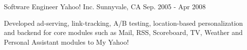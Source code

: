 \begin{cventries}
  \cventry
  {Software Engineer} %
  {Yahoo! Inc.} %
  {Sunnyvale, CA} %
  {Sep. 2005 - Apr 2008} %
  {
    \begin{cvitems} %
      \item{Developed ad-serving, link-tracking, A/B testing, location-based personalization and backend for core modules such as Mail, RSS, Scoreboard, TV, Weather and Personal Assistant modules to My Yahoo!}
    \end{cvitems}
  }

\end{cventries}
